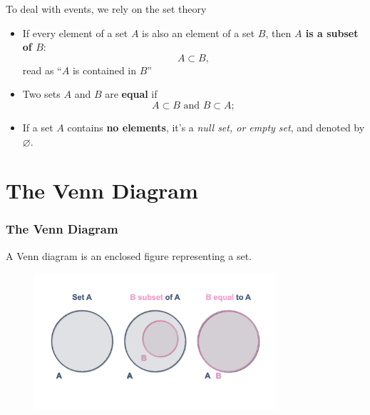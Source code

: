 \documentclass[notes=show]{beamer}\usepackage[]{graphicx}\usepackage[]{color}
\begin{document}
\begin{frame}{\secname}

To deal with events, we rely on the set theory
\pause
\begin{definition}
\begin{itemize}
\item If every element of a set $A$ is also an element of a set $B$, then \textbf{$A$ is a subset of $B$}: $$ A \subset B,$$ read as ``$A$ is contained in $B$''
\item Two sets $A$ and $B$ are \textbf{equal} if $$A \subset B \text{ \ and \ } B \subset A;$$
\item If a set $A$ contains \textbf{no elements}, it's a \textit{null set, or empty set}, and denoted by $\varnothing$.
\end{itemize}
\end{definition}
\end{frame}


%
%

\section{The Venn Diagram}

\begin{frame}
\frametitle{The Venn Diagram}

A Venn diagram is an enclosed figure representing a set.

\begin{figure}[h!]
\centering
\includegraphics[width=0.8\textwidth,height=0.6\textheight]{img/charts/charts.001.png}
\end{figure}
\end{frame}
\end{document}
